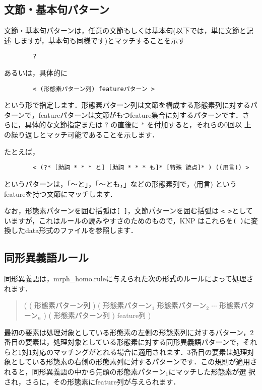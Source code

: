 \documentclass[a4j,11pt,titlepage]{jarticle}
\def\fl{$\langle$}
\def\fr{$\rangle$}
\begin{document}
\subsection{文節・基本句パターン}

文節・基本句パターンは，任意の文節もしくは基本句(以下では，単に文節と記述
しますが，基本句も同様です)とマッチすることを示す
\begin{verbatim}
        ?
\end{verbatim}
あるいは，具体的に

\begin{verbatim}
        < (形態素パターン列) featureパターン >
\end{verbatim}

という形で指定します．形態素パターン列は文節を構成する形態素列に対するパ
ターンで，featureパターンは文節がもつfeature集合に対するパターンです．さ
らに，具体的な文節指定または ? の直後に $*$ を付加すると，それらの0回以
上の繰り返しとマッチ可能であることを示します．

たとえば，
\begin{verbatim}
        < (?* [助詞 * * * と] [助詞 * * * も]* [特殊 読点]* ) ((用言)) >
\end{verbatim}
というパターンは，「〜と」，「〜とも，」などの形態素列で，\fl 用言\fr 
というfeatureを持つ文節にマッチします．

なお，形態素パターンを囲む括弧は\texttt{[ ]}，文節パターンを囲む括弧は
\texttt{< >}としていますが，これはルールの読みやすさのためのもので，KNP
はこれらを\texttt{( )}に変換したdata形式のファイルを参照します．


\subsection{同形異義語ルール}

同形異義語は，mrph\_homo.ruleに与えられた次の形式のルールによって処理されます．
\begin{quote}
  ( ( 形態素パターン列 ) ( 形態素パターン$_1$ 形態素パターン$_2$ $\cdots$ 形態素パターン$_n$ ) 
  ( 形態素パターン列 ) feature列 )
\end{quote}
最初の要素は処理対象としている形態素の左側の形態素列に対するパターン，2 
番目の要素は，処理対象としている形態素に対する同形異義語パターンで，それ
らと1対1対応のマッチングがとれる場合に適用されます．3番目の要素は処理対
象としている形態素の右側の形態素列に対するパターンです．この規則が適用さ
れると，同形異義語の中から先頭の形態素パターン$_1$にマッチした形態素が選
択され，さらに，その形態素にfeature列が与えられます．
\end{document}
